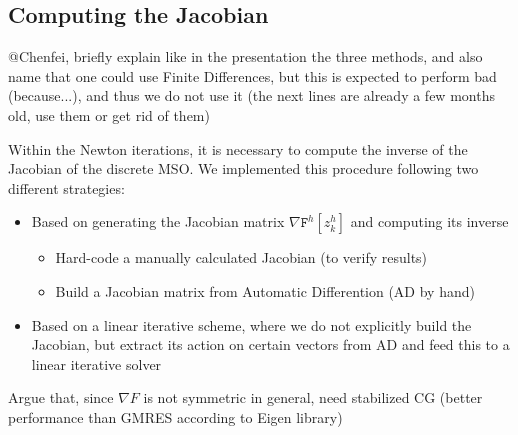 \documentclass[11pt]{scrartcl}
\newcommand{\mSurfDisc}[1]{\ensuremath{\mathtt{F}^h\left[#1\right]}}
\begin{document}
\subsection{Computing the Jacobian}
@Chenfei, briefly explain like in the presentation the three methods, and also name that one could use Finite Differences, but this is expected to perform bad (because...), and thus we do not use it (the next lines are already a few months old, use them or get rid of them)

Within the Newton iterations, it is necessary to compute the inverse of the Jacobian of the discrete MSO. We implemented this procedure following two different strategies:
\begin{itemize}
	\item Based on generating the Jacobian matrix $\nabla\mSurfDisc{z^h_k}$ and computing its inverse
	\begin{itemize}
		\item Hard-code a manually calculated Jacobian (to verify results)
		\item Build a Jacobian matrix from Automatic Differention (AD by hand)
	\end{itemize}
	\item Based on a linear iterative scheme, where we do not explicitly build the Jacobian, but extract its action on certain vectors from AD and feed this to a linear iterative solver
\end{itemize}

Argue that, since $\nabla F$ is not symmetric in general, need stabilized CG (better performance than GMRES according to Eigen library)
\end{document}
